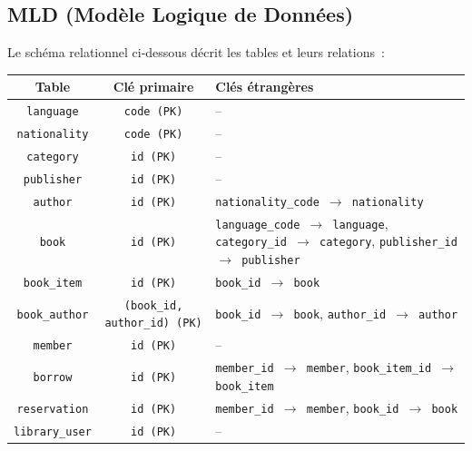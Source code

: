 \documentclass[12pt,a4paper]{article}
\newcommand{\tableheader}[1]{%
  \cellcolor{navy}\color{white}\bfseries #1%
}
\begin{document}
\subsection{MLD (Mod\`ele Logique de Donn\'ees)}
Le sch\'ema relationnel ci-dessous d\'ecrit les tables et leurs relations~:

\begin{center}
\small
\begin{tabularx}{\textwidth}{|c|c|l|}
\hline
\tableheader{Table} & \tableheader{Cl\'e primaire} & \tableheader{Cl\'es \'etrang\`eres} \\
\hline
\texttt{language} & \texttt{code (PK)} & -- \\
\texttt{nationality} & \texttt{code (PK)} & -- \\
\texttt{category} & \texttt{id (PK)} & -- \\
\texttt{publisher} & \texttt{id (PK)} & -- \\
\texttt{author} & \texttt{id (PK)} & \texttt{nationality\_code $\rightarrow$ nationality} \\
\texttt{book} & \texttt{id (PK)} & \texttt{language\_code $\rightarrow$ language}, \texttt{category\_id $\rightarrow$ category}, \texttt{publisher\_id $\rightarrow$ publisher} \\
\texttt{book\_item} & \texttt{id (PK)} & \texttt{book\_id $\rightarrow$ book} \\
\texttt{book\_author} & \texttt{(book\_id, author\_id) (PK)} & \texttt{book\_id $\rightarrow$ book}, \texttt{author\_id $\rightarrow$ author} \\
\texttt{member} & \texttt{id (PK)} & -- \\
\texttt{borrow} & \texttt{id (PK)} & \texttt{member\_id $\rightarrow$ member}, \texttt{book\_item\_id $\rightarrow$ book\_item} \\
\texttt{reservation} & \texttt{id (PK)} & \texttt{member\_id $\rightarrow$ member}, \texttt{book\_id $\rightarrow$ book} \\
\texttt{library\_user} & \texttt{id (PK)} & -- \\
\hline
\end{tabularx}
\end{center}
\end{document}
